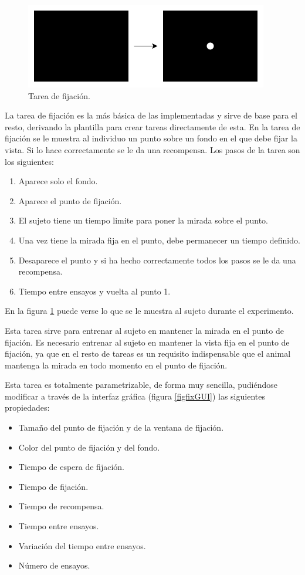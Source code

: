 \documentclass[conference]{IEEEtran}
\begin{document}
\begin{figure}[bp]
\centerline{\includegraphics[width=\linewidth]{figures/fixation}}
\caption{Tarea de fijación.}
\label{figfixTask}
\end{figure}



La tarea de fijación es la más básica de las implementadas y sirve de base para el resto, derivando la plantilla para crear tareas directamente de esta. 
En la tarea de fijación se le muestra al individuo un punto sobre un fondo en el que debe fijar la vista. Si lo hace correctamente se le da una recompensa.
Los pasos de la tarea son los siguientes:

\begin{enumerate}
	\item Aparece solo el fondo.
	\item Aparece el punto de fijación.
	\item El sujeto tiene un tiempo limite para poner la mirada sobre el punto.
	\item Una vez tiene la mirada fija en el punto, debe permanecer un tiempo definido.
	\item Desaparece el punto y si ha hecho correctamente todos los pasos se le da una recompensa.
	\item Tiempo entre ensayos y vuelta al punto 1.
\end{enumerate}

En la figura \ref{figfixTask} puede verse lo que se le muestra al sujeto durante el experimento. 

Esta tarea sirve para entrenar al sujeto en mantener la mirada en el punto de fijación. Es necesario entrenar al sujeto en mantener la vista fija en el punto de fijación, ya que en el resto de tareas es un requisito indispensable que el animal mantenga la mirada en todo momento en el punto de fijación.

Esta tarea es totalmente parametrizable, de forma muy sencilla, pudiéndose modificar a través de la interfaz gráfica (figura \ref{figfixGUI}) las siguientes propiedades:
\begin{itemize}
	\item Tamaño del punto de fijación y de la ventana de fijación.
	\item Color del punto de fijación y del fondo.
	\item Tiempo de espera de fijación.
	\item Tiempo de fijación.
	\item Tiempo de recompensa.
	\item Tiempo entre ensayos.
	\item Variación del tiempo entre ensayos.
	\item Número de ensayos.
\end{itemize}
\end{document}
